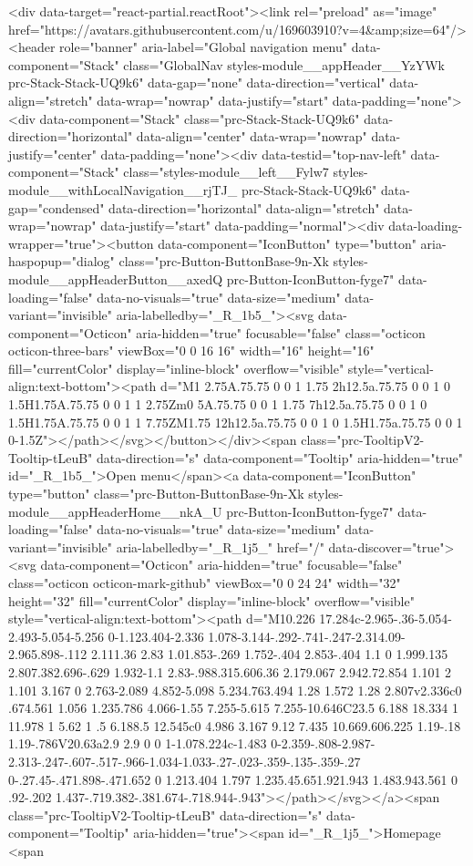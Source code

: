 {{{  <div data-target="react-partial.reactRoot"><link rel="preload" as="image" href="https://avatars.githubusercontent.com/u/169603910?v=4&amp;size=64"/><header role="banner" aria-label="Global navigation menu" data-component="Stack" class="GlobalNav styles-module__appHeader__YzYWk prc-Stack-Stack-UQ9k6" data-gap="none" data-direction="vertical" data-align="stretch" data-wrap="nowrap" data-justify="start" data-padding="none"><div data-component="Stack" class="prc-Stack-Stack-UQ9k6" data-direction="horizontal" data-align="center" data-wrap="nowrap" data-justify="center" data-padding="none"><div data-testid="top-nav-left" data-component="Stack" class="styles-module__left__Fylw7 styles-module__withLocalNavigation__rjTJ_ prc-Stack-Stack-UQ9k6" data-gap="condensed" data-direction="horizontal" data-align="stretch" data-wrap="nowrap" data-justify="start" data-padding="normal"><div data-loading-wrapper="true"><button data-component="IconButton" type="button" aria-haspopup="dialog" class="prc-Button-ButtonBase-9n-Xk styles-module__appHeaderButton__axedQ prc-Button-IconButton-fyge7" data-loading="false" data-no-visuals="true" data-size="medium" data-variant="invisible" aria-labelledby="_R_1b5_"><svg data-component="Octicon" aria-hidden="true" focusable="false" class="octicon octicon-three-bars" viewBox="0 0 16 16" width="16" height="16" fill="currentColor" display="inline-block" overflow="visible" style="vertical-align:text-bottom"><path d="M1 2.75A.75.75 0 0 1 1.75 2h12.5a.75.75 0 0 1 0 1.5H1.75A.75.75 0 0 1 1 2.75Zm0 5A.75.75 0 0 1 1.75 7h12.5a.75.75 0 0 1 0 1.5H1.75A.75.75 0 0 1 1 7.75ZM1.75 12h12.5a.75.75 0 0 1 0 1.5H1.75a.75.75 0 0 1 0-1.5Z"></path></svg></button></div><span class="prc-TooltipV2-Tooltip-tLeuB" data-direction="s" data-component="Tooltip" aria-hidden="true" id="_R_1b5_">Open menu</span><a data-component="IconButton" type="button" class="prc-Button-ButtonBase-9n-Xk styles-module__appHeaderHome__nkA_U prc-Button-IconButton-fyge7" data-loading="false" data-no-visuals="true" data-size="medium" data-variant="invisible" aria-labelledby="_R_1j5_" href="/" data-discover="true"><svg data-component="Octicon" aria-hidden="true" focusable="false" class="octicon octicon-mark-github" viewBox="0 0 24 24" width="32" height="32" fill="currentColor" display="inline-block" overflow="visible" style="vertical-align:text-bottom"><path d="M10.226 17.284c-2.965-.36-5.054-2.493-5.054-5.256 0-1.123.404-2.336 1.078-3.144-.292-.741-.247-2.314.09-2.965.898-.112 2.111.36 2.83 1.01.853-.269 1.752-.404 2.853-.404 1.1 0 1.999.135 2.807.382.696-.629 1.932-1.1 2.83-.988.315.606.36 2.179.067 2.942.72.854 1.101 2 1.101 3.167 0 2.763-2.089 4.852-5.098 5.234.763.494 1.28 1.572 1.28 2.807v2.336c0 .674.561 1.056 1.235.786 4.066-1.55 7.255-5.615 7.255-10.646C23.5 6.188 18.334 1 11.978 1 5.62 1 .5 6.188.5 12.545c0 4.986 3.167 9.12 7.435 10.669.606.225 1.19-.18 1.19-.786V20.63a2.9 2.9 0 0 1-1.078.224c-1.483 0-2.359-.808-2.987-2.313-.247-.607-.517-.966-1.034-1.033-.27-.023-.359-.135-.359-.27 0-.27.45-.471.898-.471.652 0 1.213.404 1.797 1.235.45.651.921.943 1.483.943.561 0 .92-.202 1.437-.719.382-.381.674-.718.944-.943"></path></svg></a><span class="prc-TooltipV2-Tooltip-tLeuB" data-direction="s" data-component="Tooltip" aria-hidden="true"><span id="_R_1j5_">Homepage <span }}}
